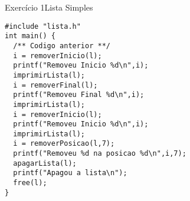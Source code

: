 \documentclass[aspectratio=169]{beamer}
\begin{document}

\begin{frame}[fragile]{Exercício 1}{Lista Simples}
\begin{lstlisting}[style=CStyle]
#include "lista.h"
int main() {
  /** Codigo anterior **/
  i = removerInicio(l);
  printf("Removeu Inicio %d\n",i);
  imprimirLista(l);
  i = removerFinal(l);
  printf("Removeu Final %d\n",i);
  imprimirLista(l);
  i = removerInicio(l);
  printf("Removeu Inicio %d\n",i);
  imprimirLista(l);
  i = removerPosicao(l,7);
  printf("Removeu %d na posicao %d\n",i,7);
  apagarLista(l);
  printf("Apagou a lista\n");
  free(l);
}
\end{lstlisting}  
\end{frame}


\begin{frame}[plain]
  \titlepage
\end{frame}
\end{document}
